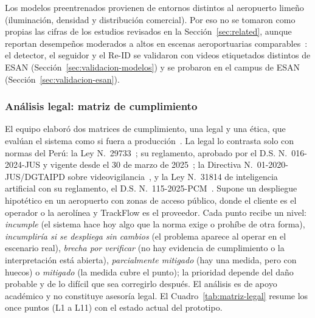 \documentclass[12pt,a4paper]{article}
\begin{document}
Los modelos preentrenados provienen de entornos distintos al aeropuerto
limeño (iluminación, densidad y distribución comercial). Por eso no se
tomaron como propias las cifras de los estudios revisados en la
Sección~\ref{sec:related}, aunque reportan desempeños moderados a altos en
escenas aeroportuarias comparables~\cite{zhou2026,ryan2023}: el detector,
el seguidor y el Re-ID se validaron con videos etiquetados distintos de
ESAN (Sección~\ref{sec:validacion-modelos}) y se probaron en el campus de
ESAN (Sección~\ref{sec:validacion-esan}).

\subsubsection{Análisis legal: matriz de cumplimiento}
\label{sec:analisis-legal}

El equipo elaboró dos matrices de cumplimiento, una legal y una ética, que
evalúan el sistema como si fuera a producción~\cite{matrices2026}. La legal lo
contrasta solo con normas del Perú: la Ley N.\textdegree~29733~\cite{ley29733};
su reglamento, aprobado por el D.S. N.\textdegree~016-2024-JUS y vigente desde
el 30 de marzo de 2025~\cite{reglamento29733,recordinglaw}; la Directiva
N.\textdegree~01-2020-JUS/DGTAIPD sobre videovigilancia~\cite{directiva-videovigilancia},
y la Ley N.\textdegree~31814 de inteligencia artificial con su reglamento, el
D.S. N.\textdegree~115-2025-PCM~\cite{cele-ia,cuatrecasas-ia}. Supone un
despliegue hipotético en un aeropuerto con zonas de acceso público, donde el
cliente es el operador o la aerolínea y TrackFlow es el proveedor. Cada punto
recibe un nivel: \textit{incumple} (el sistema hace hoy algo que la norma exige
o prohíbe de otra forma), \textit{incumpliría si se despliega sin cambios} (el
problema aparece al operar en el escenario real), \textit{brecha por verificar}
(no hay evidencia de cumplimiento o la interpretación está abierta),
\textit{parcialmente mitigado} (hay una medida, pero con huecos) o
\textit{mitigado} (la medida cubre el punto); la prioridad
depende del daño probable y de lo difícil que sea corregirlo después. El
análisis es de apoyo académico y no constituye asesoría legal. El Cuadro~\ref{tab:matriz-legal} resume los once puntos (L1 a
L11) con el estado actual del prototipo.
\end{document}

